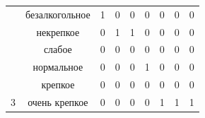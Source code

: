 \begin{table}[H]
\begin{center}
\begin{tabular}{|c|c|ccccccc|}
		
		{\color[HTML]{333333} }                                                    & безалкогольное                                 & \multicolumn{1}{c|}{1}                        & \multicolumn{1}{c|}{0}                        & \multicolumn{1}{c|}{0}     & \multicolumn{1}{c|}{0}      & \multicolumn{1}{c|}{0}      & \multicolumn{1}{c|}{0}        & \multicolumn{1}{c|}{0}  \\ \cline{2-9}
		{\color[HTML]{333333} }                                                    & {\color[HTML]{333333} некрепкое}    & \multicolumn{1}{c|}{{\color[HTML]{333333} 0}} & \multicolumn{1}{c|}{{\color[HTML]{333333} 1}} & \multicolumn{1}{c|}{1}     & \multicolumn{1}{c|}{0}      & \multicolumn{1}{c|}{0}      & \multicolumn{1}{c|}{0}        & \multicolumn{1}{c|}{0}                       \\ \cline{2-9}
		{\color[HTML]{333333} }                                                    & {\color[HTML]{333333} слабое}    & \multicolumn{1}{c|}{{\color[HTML]{333333} 0}} & \multicolumn{1}{c|}{{\color[HTML]{333333} 0}} & \multicolumn{1}{c|}{0}     & \multicolumn{1}{c|}{0}      & \multicolumn{1}{c|}{0}      & \multicolumn{1}{c|}{0}        & \multicolumn{1}{c|}{0}                       \\ \cline{2-9}
		{\color[HTML]{333333} }                                                    & {\color[HTML]{333333} нормальное}             & \multicolumn{1}{c|}{{\color[HTML]{333333} 0}} & \multicolumn{1}{c|}{{\color[HTML]{333333} 0}} & \multicolumn{1}{c|}{0}     & \multicolumn{1}{c|}{1}      & \multicolumn{1}{c|}{0}      & \multicolumn{1}{c|}{0}        & \multicolumn{1}{c|}{0}                       \\ \cline{2-9}
		{\color[HTML]{333333} }                                                    & {\color[HTML]{333333} крепкое}       & \multicolumn{1}{c|}{{\color[HTML]{333333} 0}} & \multicolumn{1}{c|}{{\color[HTML]{333333} 0}} & \multicolumn{1}{c|}{0}     & \multicolumn{1}{c|}{0}      & \multicolumn{1}{c|}{0}      & \multicolumn{1}{c|}{0}        & \multicolumn{1}{c|}{0}                       \\ \cline{2-9}
		\multirow{-6}{*}{{\color[HTML]{333333} 3}}                                 & {\color[HTML]{333333} очень крепкое  } & \multicolumn{1}{c|}{{\color[HTML]{333333} 0}} & \multicolumn{1}{c|}{{\color[HTML]{333333} 0}} & \multicolumn{1}{c|}{0}     & \multicolumn{1}{c|}{0}      & \multicolumn{1}{c|}{1}      & \multicolumn{1}{c|}{1}        & \multicolumn{1}{c|}{1}                       \\ \cline{1-9}

\end{tabular}
\end{center}
\end{table}
